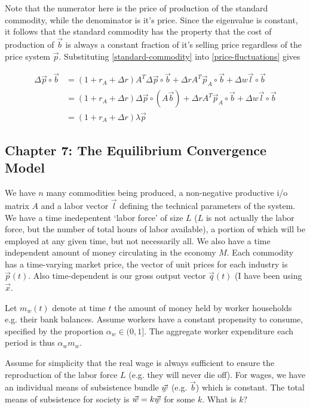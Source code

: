 \documentclass{article}
\newcommand{\ubar}[1]{\underaccent{\bar}{#1}}
\theoremstyle{definition}
\begin{document}
Note that the numerator here is the price of production of the standard commodity, while the denominator is it's price. Since the eigenvalue is constant, it follows that the standard commodity has the property that the cost of production of $\vec{b}$ is always a constant fraction of it's selling price regardless of the price system $\vec{p}$. Substituting \ref{standard-commodity} into \ref{price-fluctuations} gives

\begin{align}
    \Delta \vec{p} \circ \vec{b} &= (1+r_A+\Delta r)A^T\Delta \vec{p}\circ \vec{b}+\Delta r A^T\vec{p}_A\circ \vec{b} + \Delta w \vec{l} \circ \vec{b} \\
                                 &= (1+r_A+\Delta r) \Delta \vec{p} \circ (A\vec{b}) + \Delta r A^T\vec{p}_A\circ \vec{b} + \Delta w \vec{l} \circ \vec{b} \\
                                 &= (1+r_A+\Delta r) \lambda \vec{p}
\end{align}

\subsection{Chapter 7: The Equilibrium Convergence Model}

We have $n$ many commodities being produced, a non-negative productive i/o matrix $A$ and a labor vector $\vec{l}$ defining the technical parameters of the system. We have a time inedepentent `labor force' of size $L$ ($L$ is not actually the labor force, but the number of total hours of labor available), a portion of which will be employed at any given time, but not necessarily all. We also have a time independent amount of money circulating in the economy $M$. Each commodity has a time-varying market price, the vector of unit prices for each industry is $\vec{p}(t)$. Also time-dependent is our gross output vector $\vec{q}(t)$ (I have been using $\vec{x}$.

Let $m_w(t)$ denote at time $t$ the amount of money held by worker households e.g. their bank balances. Assume workers have a constant propensity to consume, specified by the proportion $\alpha_w \in (0,1]$. The aggregate worker expenditure each period is thus $\alpha_wm_w$.  

Assume for simplicity that the real wage is always sufficient to ensure the reproduction of the labor force $L$ (e.g. they will never die off). For wages, we have an individual means of subsistence bundle $\vec{\ubar{w}}$ (e.g. $\vec{b}$) which is constant. The total means of subsistence for society is $\vec{w} = k\vec{\ubar{w}}$ for some $k$. What is $k$?
\end{document}
